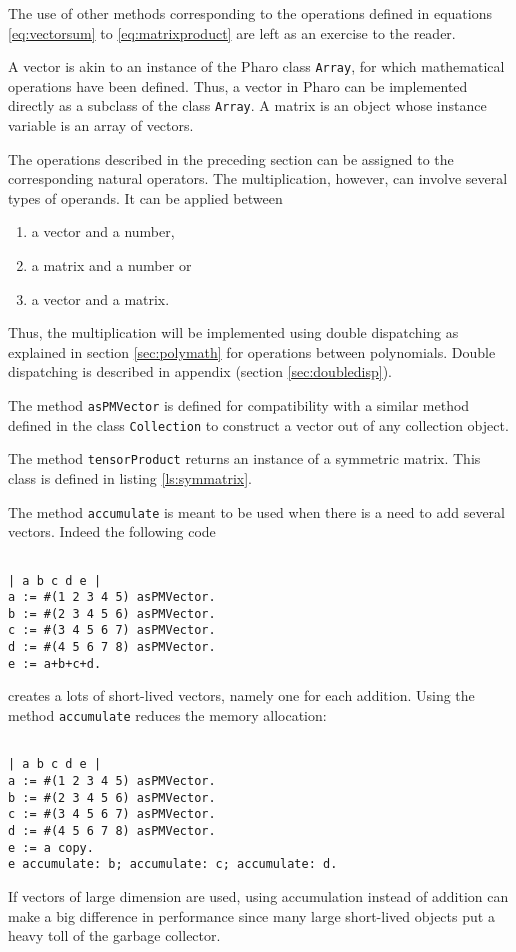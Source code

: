 \documentclass[twoside]{book}
\begin{document}
The use of other methods corresponding to the operations defined
in equations \ref{eq:vectorsum} to \ref{eq:matrixproduct} are left
as an exercise to the reader.

 A vector is akin to an instance of the
Pharo class {\tt Array}, for which mathematical operations
have been defined. Thus, a vector in Pharo can be implemented
directly as a subclass of the class {\tt Array}. A matrix is an
object whose instance variable is an array of vectors.

The operations described in the preceding section can be assigned
to the corresponding natural operators. The multiplication,
however, can involve several types of operands. It can be applied
between
\begin{enumerate}
  \item a vector and a number,
  \item a matrix and a number or
  \item a vector and a matrix.
\end{enumerate}
Thus, the multiplication will be implemented using double
dispatching as explained in section \ref{sec:polymath} for
operations between polynomials. Double dispatching is described in
appendix (\cf section \ref{sec:doubledisp}).

The method {\tt asPMVector} is defined for compatibility with a
similar method defined in the class {\tt Collection} to construct a
vector out of any collection object.

The method {\tt tensorProduct} returns an instance of a symmetric
matrix. This class is defined in listing \ref{ls:symmatrix}.

The method {\tt accumulate} is meant to be used when there is a
need to add several vectors. Indeed the following code
\begin{codeExample}
\begin{verbatim}

| a b c d e |
a := #(1 2 3 4 5) asPMVector.
b := #(2 3 4 5 6) asPMVector.
c := #(3 4 5 6 7) asPMVector.
d := #(4 5 6 7 8) asPMVector.
e := a+b+c+d.
\end{verbatim}
\end{codeExample}
creates a lots of short-lived vectors, namely one
for each addition. Using the method {\tt accumulate} reduces the
memory allocation:
\begin{codeExample}
\begin{verbatim}

| a b c d e |
a := #(1 2 3 4 5) asPMVector.
b := #(2 3 4 5 6) asPMVector.
c := #(3 4 5 6 7) asPMVector.
d := #(4 5 6 7 8) asPMVector.
e := a copy.
e accumulate: b; accumulate: c; accumulate: d.
\end{verbatim}
\end{codeExample}
If vectors of large dimension are used, using accumulation instead
of addition can make a big difference in performance since many
large short-lived objects put a heavy toll of the garbage
collector.
\end{document}

